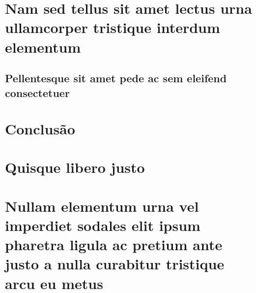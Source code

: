 \documentclass[12pt,openright,twoside,a4paper]{abntex2}
\begin{document}
\lipsum[21-22]

\chapter{Nam sed tellus sit amet lectus urna ullamcorper tristique interdum
elementum}

\section{Pellentesque sit amet pede ac sem eleifend consectetuer}

\lipsum[24]

% 

\postextual

\chapter*{Conclusão}

\lipsum[31-33]



%
%


\begin{apendicesenv}

\appendixpage

\chapter{Quisque libero justo}

\lipsum[50]

\chapter{Nullam elementum urna vel imperdiet sodales elit ipsum pharetra ligula
ac pretium ante justo a nulla curabitur tristique arcu eu metus}
\lipsum[55-57]

\end{apendicesenv}
\end{document}
